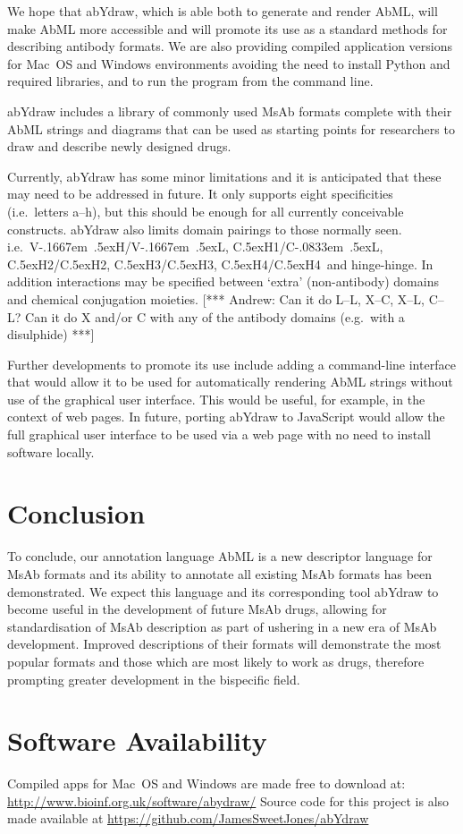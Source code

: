 \documentclass[a4paper]{article}
\newcommand{\VH}{\mbox{V\kern-.1667em \lower.5ex\hbox{\scriptsize H}}}
\newcommand{\VL}{\mbox{V\kern-.1667em \lower.5ex\hbox{\scriptsize L}}}
\newcommand{\VHVL}{\mbox{\VH/\VL}}
\newcommand{\CH}[1]{\mbox{C\lower.5ex\hbox{\scriptsize H}#1}}
\newcommand{\CL}{\mbox{C\kern-.0833em \lower.5ex\hbox{\scriptsize L}}}
\newcommand{\andrew}[1]{{\color{red} [*** Andrew: #1 ***]}}
\begin{document}
We hope that abYdraw, which is able both to generate and render AbML,
will make AbML more accessible and will promote its use as a standard
methods for describing antibody formats.  We are also providing
compiled application versions for Mac~OS and Windows environments
avoiding the need to install Python and required libraries, and to run
the program from the command line.

abYdraw includes a library of commonly used MsAb formats complete with their AbML
strings and diagrams that can be used as starting points for
researchers to draw and describe newly designed drugs.

Currently, abYdraw has some minor limitations and it is anticipated that
these may need to be addressed in future. It only supports eight
specificities (i.e.\ letters a--h), but this should be enough for all
currently conceivable constructs.  abYdraw also
limits domain pairings to those normally seen. i.e.\ \VHVL,
\CH{1}/\CL, \CH{2}/\CH{2}, \CH{3}/\CH{3}, \CH{4}/\CH{4}\ and
hinge-hinge. In addition interactions may be specified between `extra'
(non-antibody) domains and chemical conjugation moieties.  \andrew{Can
  it do L--L, X--C, X--L, C--L? Can it do X and/or C with any of the
  antibody domains (e.g.\ with a disulphide)}

Further developments to promote its use include adding a command-line
interface that would allow it to be used for automatically rendering
AbML strings without use of the graphical user interface. This would
be useful, for example, in the context of web pages. In future,
porting abYdraw to JavaScript would allow the full graphical user
interface to be used via a web page with no need to install software
locally.


\section{Conclusion}

To conclude, our annotation language AbML is a new descriptor language
for MsAb formats and its ability to annotate all existing MsAb formats
has been demonstrated. We expect this language and its corresponding
tool abYdraw to become useful in the development of future MsAb drugs,
allowing for standardisation of MsAb description as part of ushering
in a new era of MsAb development. Improved descriptions of their
formats will demonstrate the most popular formats and those which are
most likely to work as drugs, therefore prompting greater development
in the bispecific field.  

\section{Software Availability}
Compiled apps for Mac~OS and Windows are made free to download at:
\url{http://www.bioinf.org.uk/software/abydraw/}
Source code for this project is also made available at
\url{https://github.com/JamesSweetJones/abYdraw}

 
\end{document}
